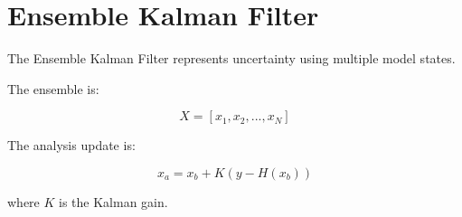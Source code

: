 \section{Ensemble Kalman Filter}


The Ensemble Kalman Filter represents uncertainty using
multiple model states.



The ensemble is:


\begin{equation}
X=
[x_1,x_2,...,x_N]
\end{equation}



The analysis update is:


\begin{equation}
x_a
=
x_b
+
K(y-H(x_b))
\end{equation}



where $K$ is the Kalman gain.
